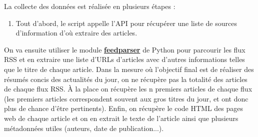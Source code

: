 \documentclass[french]{article}
\begin{document}
    La collecte des données est réalisée en plusieurs étapes :
    \begin{enumerate}
        \item Tout d'abord, le script appelle l'API pour récupérer une liste de sources d'information d'où extraire des articles.
    \end{enumerate}
    On va ensuite utiliser le module \textbf{\href{https://pypi.org/project/feedparser/}{feedparser}} de Python pour parcourir les flux RSS et en extraire une liste d'URLs d'articles avec d'autres informations telles que le titre de chaque article. Dans la mesure où l'objectif final est de réaliser des résumés concis des actualités du jour, on ne récupère pas la totalité des articles de chaque flux RSS. À la place on récupère les n premiers articles de chaque flux (les premiers articles correspondent souvent aux gros titres du jour, et ont donc plus de chance d'être pertinents).
    Enfin, on récupère le code HTML des pages web de chaque article et on en extrait le texte de l'article ainsi que plusieurs métadonnées utiles (auteurs, date de publication...). 
\end{document}
